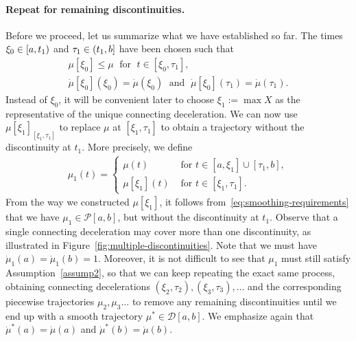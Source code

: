 \documentclass[a4paper]{article}
\theoremstyle{definition}
\theoremstyle{plain}
\begin{document}
\paragraph{Repeat for remaining discontinuities.}
Before we proceed, let us summarize what we have established so far.
%
The times $\xi_{0} \in [a,t_{1})$ and
$\tau_{1} \in (t_{1},b]$ have been chosen such that
\begin{subequations}\label{eq:smoothing-requirements}
\begin{gather}
  \mu[\xi_{0}] \leq \mu \; \text{ for } \; t \in [\xi_{0}, \tau_{1}] , \\
  \dot{\mu}[\xi_{0}](\xi_{0}) = \dot{\mu}(\xi_{0}) \; \text{ and } \; \dot{\mu}[\xi_{0}](\tau_{1}) = \dot{\mu}(\tau_{1}) .
\end{gather}
\end{subequations}
Instead of $\xi_{0}$, it will be convenient later to choose $\xi_{1} := \max X$
as the representative of the unique connecting deceleration.
%
We can now use $\mu[\xi_{1}]_{[\xi_{1},\tau_{1}]}$ to replace $\mu$ at $[\xi_{1}, \tau_{1}]$ to
obtain a trajectory without the discontinuity at $t_{1}$. More precisely, we
define
\begin{align}
  \mu_{1}(t) =
  \begin{cases}
    \mu(t) &\text{ for } t \in [a, \xi_{1}] \cup [\tau_{1}, b] , \\
    \mu[\xi_{1}](t) &\text{ for } t \in [\xi_{1}, \tau_{1}] .
  \end{cases}
\end{align}
From the way we constructed $\mu[\xi_{1}]$, it follows
from~\eqref{eq:smoothing-requirements} that we have
$\mu_{1} \in \mathcal{P}[a,b]$, but without the discontinuity at $t_{1}$.
%
Observe that a single connecting deceleration may cover more than one
discontinuity, as illustrated in Figure~\ref{fig:multiple-discontinuities}.
%
Note that we must have $\dot{\mu}_{1}(a) = \dot{\mu}_{1}(b) = 1$.
%
Moreover, it is not difficult to see that $\mu_{1}$ must still satisfy
Assumption~\ref{assump2}, so that we can keep repeating the exact same process,
obtaining connecting decelerations
$(\xi_{2}, \tau_2), (\xi_{3}, \tau_{3}), \dots $ and the corresponding piecewise
trajectories $\mu_{2}, \mu_{3} \dots$ to remove any remaining discontinuities
until we end up with a smooth trajectory $\mu^{*} \in \mathcal{D}[a,b]$.
%
We emphasize again that $\dot{\mu}^{*}(a) = \dot{\mu}(a)$ and
$\dot{\mu}^{*}(b) = \dot{\mu}(b)$.
\end{document}
